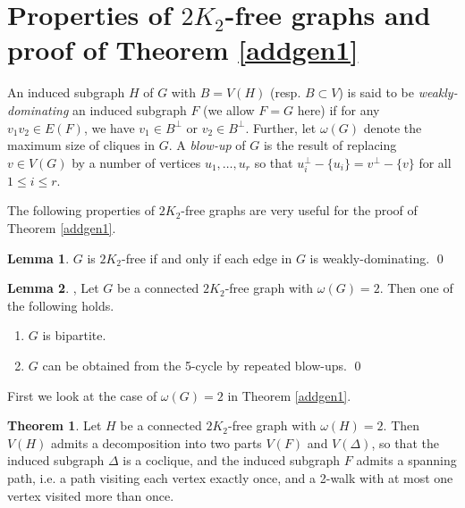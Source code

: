 \documentclass{amsart}
\theoremstyle{definition}
\newtheorem{theorem}{Theorem}
\newtheorem{lemma}{Lemma}
\begin{document}
\section{Properties of $2K_2$-free graphs and proof of Theorem \ref{addgen1}}
An induced subgraph $H$ of $G$ with $B=V(H)$ (resp. $B\subset V$) is said to be {\em weakly-dominating}
an induced subgraph $F$ (we allow $F=G$ here) 
if for any $v_1v_2\in E(F)$, we have $v_1\in B^\perp$ or $v_2\in B^\perp$.
Further, let $\omega(G)$ denote the maximum size of cliques in $G$.
A {\em blow-up} of $G$ is the result of replacing $v\in V(G)$ 
by a number of vertices $u_1,\dots,u_r$ so that $u_i^\perp-\{u_i\}=v^\perp-\{v\}$
for all $1\leq i\leq r$.


The following properties of $2K_2$-free graphs are very useful for the proof of Theorem \ref{addgen1}.
\begin{lemma}\label{trivial}
$G$ is $2K_2$-free if and only if each edge in $G$ is weakly-dominating. \qed
\end{lemma}

\begin{lemma}\label{lm1}{\cite[Theorem 2]{chung1990maximum}, \cite[Lemma 2]{broersma2014toughness}}
Let $G$ be a connected $2K_2$-free graph with $\omega(G)=2$. Then one of the following holds. 
\begin{enumerate}
\item $G$ is bipartite.
\item $G$ can be obtained from the 5-cycle by repeated blow-ups. \qed
\end{enumerate}
\end{lemma}

First we look at the case of  $\omega(G)=2$ in Theorem \ref{addgen1}.
\begin{theorem}\label{thm4}
Let $H$ be a connected $2K_2$-free graph with $\omega(H)=2$. 
Then $V(H)$ admits a decomposition into two parts $V(F)$ and $V(\Delta)$, so that the induced subgraph $\Delta$ is a coclique, and the induced subgraph $F$ admits
a spanning path, i.e. a path visiting each vertex exactly once, and 
a 2-walk with at most one vertex visited more than once.
\end{theorem}
\end{document}
